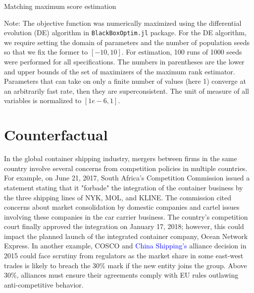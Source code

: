 \documentclass[10pt]{article}
\begin{document}
\begin{table}[!htbp]
  \begin{center}
      \caption{Matching maximum score estimation}
      \label{tb:maximum_score_estimate} 
      
  \end{center}\footnotesize
  Note: The objective function was numerically maximized using the differential evolution (DE) algorithm in \texttt{BlackBoxOptim.jl} package. For the DE algorithm, we require setting the domain of parameters and the number of population seeds so that we fix the former to $[-10, 10]$. For estimation, 100 runs of 1000 seeds were performed for all specifications. The numbers in parentheses are the lower and upper bounds of the set of maximizers of the maximum rank estimator. Parameters that can take on only a finite number of values (here 1) converge at an arbitrarily fast rate, then they are superconsistent. The unit of measure of all variables is normalized to $[1e-6,1]$. 
\end{table} 

\section{Counterfactual}\label{sec:counterfactuals}

In the global container shipping industry, mergers between firms in the same country involve several concerns from competition policies in multiple countries.
For example, on June 21, 2017, South Africa's Competition Commission issued a statement stating that it "forbade" the integration of the container business by the three shipping lines of NYK, MOL, and KLINE. 
The commission cited concerns about market consolidation by domestic companies and cartel issues involving these companies in the car carrier business.
The country's competition court finally approved the integration on January 17, 2018; however, this could impact the planned launch of the integrated container company, Ocean Network Express. 
In another example, COSCO and \textcolor{blue}{China Shipping's} alliance decision in 2015 could face scrutiny from regulators as the market share in some east-west trades is likely to breach the 30\% mark if the new entity joins the group. Above 30\%, alliances must ensure their agreements comply with EU rules outlawing anti-competitive behavior.
\end{document}
